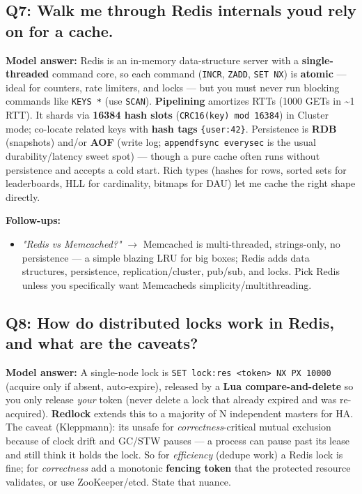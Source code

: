 \documentclass[11pt]{article}
\providecommand{\tightlist}{\setlength{\itemsep}{1pt}\setlength{\parskip}{0pt}}
\begin{document}
\subsection{Q7: Walk me through Redis internals you\textquotesingle d rely on for a cache.}\label{q7-walk-me-through-redis-internals-youd-rely-on-for-a-cache}

\textbf{Model answer:} Redis is an in-memory data-structure server with a \textbf{single-threaded} command core, so each command (\texttt{INCR}, \texttt{ZADD}, \texttt{SET\ NX}) is \textbf{atomic} --- ideal for counters, rate limiters, and locks --- but you must never run blocking commands like \texttt{KEYS\ *} (use \texttt{SCAN}). \textbf{Pipelining} amortizes RTTs (1000 GETs in \textasciitilde1 RTT). It shards via \textbf{16384 hash slots} (\texttt{CRC16(key)\ mod\ 16384}) in Cluster mode; co-locate related keys with \textbf{hash tags} \texttt{\{user:42\}}. Persistence is \textbf{RDB} (snapshots) and/or \textbf{AOF} (write log; \texttt{appendfsync\ everysec} is the usual durability/latency sweet spot) --- though a pure cache often runs without persistence and accepts a cold start. Rich types (hashes for rows, sorted sets for leaderboards, HLL for cardinality, bitmaps for DAU) let me cache the right shape directly.

\textbf{Follow-ups:}

\begin{itemize}
\tightlist
\item
  \emph{"Redis vs Memcached?"} \(\rightarrow\) Memcached is multi-threaded, strings-only, no persistence --- a simple blazing LRU for big boxes; Redis adds data structures, persistence, replication/cluster, pub/sub, and locks. Pick Redis unless you specifically want Memcached\textquotesingle s simplicity/multithreading.
\end{itemize}

\subsection{Q8: How do distributed locks work in Redis, and what are the caveats?}\label{q8-how-do-distributed-locks-work-in-redis-and-what-are-the-caveats}

\textbf{Model answer:} A single-node lock is \texttt{SET\ lock:res\ \textless{}token\textgreater{}\ NX\ PX\ 10000} (acquire only if absent, auto-expire), released by a \textbf{Lua compare-and-delete} so you only release \emph{your} token (never delete a lock that already expired and was re-acquired). \textbf{Redlock} extends this to a majority of N independent masters for HA. The caveat (Kleppmann): it\textquotesingle s unsafe for \emph{correctness}-critical mutual exclusion because of clock drift and GC/STW pauses --- a process can pause past its lease and still think it holds the lock. So for \emph{efficiency} (dedupe work) a Redis lock is fine; for \emph{correctness} add a monotonic \textbf{fencing token} that the protected resource validates, or use ZooKeeper/etcd. State that nuance.
\end{document}

